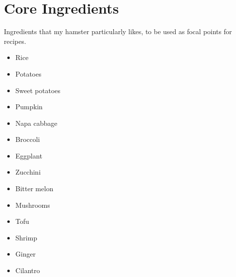 \documentclass[main]{subfiles}
\begin{document}
\section{Core Ingredients}

Ingredients that my hamster particularly likes, to be used as focal points for recipes.

\begin{itemize}
    \item Rice
    
    \item Potatoes
    \item Sweet potatoes
    \item Pumpkin

    \item Napa cabbage
    \item Broccoli
    \item Eggplant
    \item Zucchini
    \item Bitter melon
    \item Mushrooms

    \item Tofu
    \item Shrimp

    \item Ginger
    \item Cilantro
\end{itemize}
\end{document}
